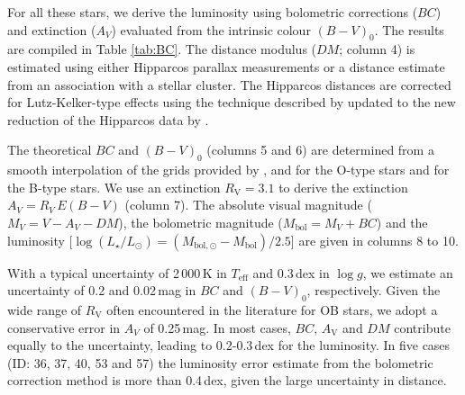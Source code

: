 \documentclass[useAMS,usenatbib]{mn2e}
\newcommand{\teff}{T_\mathrm{eff}}
\newcommand{\lum}{\log(L_\star/L_\odot)}
\newcommand{\logg}{\log g}
\begin{document}
For all these stars, we derive the luminosity using bolometric corrections ($BC$) and extinction ($A_V$) evaluated from the intrinsic colour $(B-V)_0$. The results are compiled in Table \ref{tab:BC}. 
The distance modulus ($DM$; column 4) is estimated using either Hipparcos parallax measurements or a distance estimate from an association with a stellar cluster.
The Hipparcos distances are corrected for Lutz-Kelker-type effects \citep{1973PASP...85..573L} using the technique described by \citeauthor{2001AJ....121.2737M} \citeyearpar{2001AJ....121.2737M,2005ESASP.576..179M} updated to the new reduction of the Hipparcos data \citep{2007A&A...474..653V} by \citet{2008arXiv0804.2553M}.
\begin{table}
	\begin{center}
	\caption{\label{tab:BC}Luminosity determination based on bolometric correction and extinction from intrinsic colours (\S\,\ref{sec:lum}).}
		{}
	\end{center}
\end{table}

The theoretical $BC$ and $(B-V)_0$ (columns 5 and 6) are determined from a smooth interpolation of the grids provided by \citet{2005A&A...436.1049M}, and \citet{2006A&A...457..637M} for the O-type stars and \citet{2007ApJS..169...83L} for the B-type stars. 
We use an extinction $R_\mathrm{V}=3.1$ to derive the extinction $A_V=R_V\,E(B-V)$ (column 7). 
The absolute visual magnitude ($M_V=V-A_V-DM$), the bolometric magnitude ($M_\mathrm{bol}=M_V+BC$) and the luminosity [$\lum=(M_{\mathrm{bol},\odot}-M_\mathrm{bol})/2.5$] are given in columns 8 to 10.

With a typical uncertainty of 2\,000\,K in $\teff$ and 0.3\,dex in $\logg$, we estimate an uncertainty of 0.2 and 0.02\,mag in $BC$ and $(B-V)_0$, respectively. Given the wide range of $R_\mathrm{V}$ often encountered in the literature for OB stars, we adopt a conservative error in $A_V$ of 0.25\,mag. 
In most cases, $BC$, $A_\mathrm{V}$ and $DM$ contribute equally to the uncertainty, leading to 0.2-0.3\,dex for the luminosity.  In five cases (ID: 36, 37, 40, 53 and 57) the luminosity error estimate from the bolometric correction method is more than 0.4\,dex, given the large uncertainty in distance.





\begin{table}
	\begin{center}
	\caption{\label{tab:lumCho}Luminosity determination based on SED fitting with \textsc{Chorizos} (\S\,\ref{sec:lum}).}
		{}
	\end{center}
\end{table}
\end{document}
